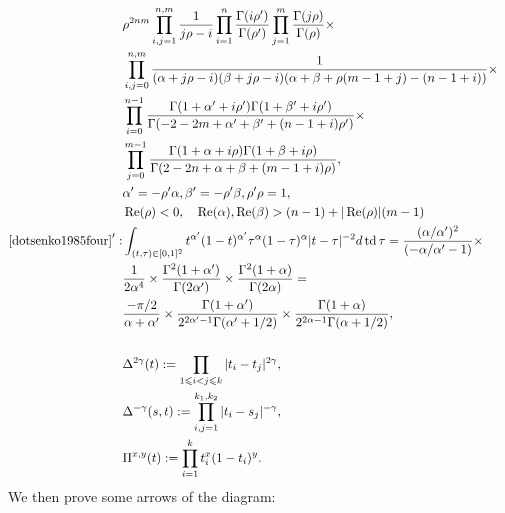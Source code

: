 \documentclass{article}
\newcommand{\assign}{:=}
\newcommand{\tmop}[1]{\ensuremath{\operatorname{#1}}}
\begin{document}
\begin{eqnarray}
  & \rho^{2 n m} \prod_{i, j = 1}^{n, m} \frac{1}{j \rho - i} \prod_{i = 1}^n
  \frac{\Gamma (i \rho')}{\Gamma (\rho')} \prod_{j = 1}^m \frac{\Gamma (j
  \rho)}{\Gamma (\rho)} \times &  \nonumber\\
  & \prod_{i, j = 0}^{n, m} \frac{1}{(\alpha + j \rho - i) (\beta + j \rho -
  i) (\alpha + \beta + \rho (m - 1 + j) - (n - 1 + i))} \times &  \nonumber\\
  & \prod_{i = 0}^{n - 1} \frac{\Gamma (1 + \alpha' + i \rho') \Gamma (1 +
  \beta' + i \rho')}{\Gamma (- 2 - 2 m + \alpha' + \beta' + (n - 1 + i)
  \rho')} \times &  \nonumber\\
  & \prod_{j = 0}^{m - 1} \frac{\Gamma (1 + \alpha + i \rho) \Gamma (1 +
  \beta + i \rho)}{\Gamma (2 - 2 n + \alpha + \beta + (m - 1 + i) \rho)}, & 
  \nonumber\\
  & \alpha' = - \rho' \alpha, \beta' = - \rho' \beta, \rho' \rho = 1, & 
  \nonumber\\
  & \tmop{Re} (\rho) < 0, \quad \tmop{Re} (\alpha), \tmop{Re} (\beta) > (n -
  1) + | \tmop{Re} (\rho) | (m - 1) &  \nonumber\\
  \mathrm{{\cite{dotsenko1985four}}}' : & \int_{(t, \tau) \in [0, 1]^2}
  t^{\alpha'} (1 - t)^{\alpha'} \tau^{\alpha} (1 - \tau)^{\alpha} | t - \tau
  |^{- 2} d \tmop{td} \tau = \frac{(\alpha / \alpha')^2}{(- \alpha / \alpha' -
  1)} \times &  \nonumber\\
  & \frac{1}{2 \alpha^4} \times \frac{\Gamma^2 (1 + \alpha')}{\Gamma (2
  \alpha')} \times \frac{\Gamma^2 (1 + \alpha)}{\Gamma (2 \alpha)} = & 
  \nonumber\\
  & \frac{- \pi / 2}{\alpha + \alpha'} \times \frac{\Gamma (1 +
  \alpha')}{2^{2 \alpha' - 1} \Gamma (\alpha' + 1 / 2)} \times \frac{\Gamma (1
  + \alpha)}{2^{2 \alpha - 1} \Gamma (\alpha + 1 / 2)}, &  \nonumber\\
  &  &  \nonumber\\
  & \Delta^{2 \gamma} (t) \assign \prod_{1 \leqslant i < j \leqslant k} | t_i
  - t_j |^{2 \gamma}, &  \nonumber\\
  & \Delta^{- \gamma}  (s, t) \assign \prod_{i, j = 1}^{k_1, k_2} | t_i - s_j
  |^{- \gamma}, &  \nonumber\\
  & \Pi^{x, y} (t) \assign \prod_{i = 1}^k t_i^x (1 - t_i)^y . &  \nonumber
\end{eqnarray}
We then prove some arrows of the diagram:
\end{document}
